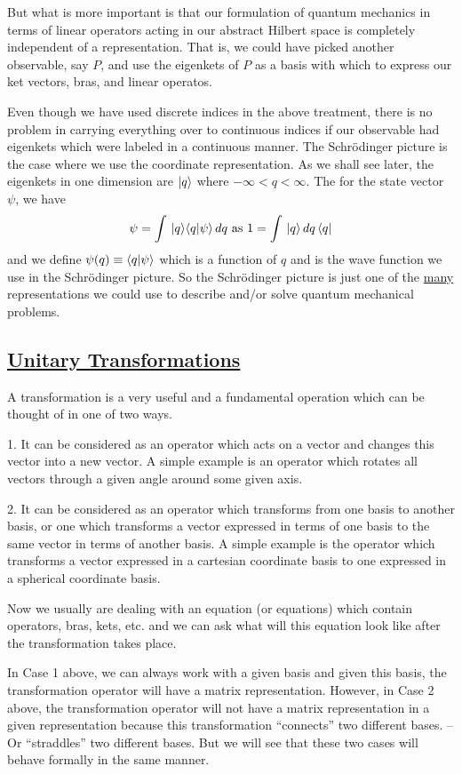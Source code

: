 But what is more important is that our formulation of quantum mechanics in terms of linear operators acting in our abstract  
Hilbert space is completely independent of a representation. That is, we could have picked another observable, say $P$, and use the eigenkets of $P$ as a basis with which to express our ket vectors, bras, and linear operatos. 

Even though we have used discrete indices in the above treatment, there is no problem in carrying everything over to continuous indices if our observable had eigenkets which were labeled in a continuous manner. The Schr\"odinger
picture is the case where we use the coordinate representation. As we shall see later, the eigenkets in one dimension are $|q\rangle$ where $-\infty < q < \infty$. The for the state vector $\psi$, we have
$$\psi = \int\, |q\rangle\langle q|\psi\rangle\, dq \mbox{ as } 1 = \int\, |q\rangle\, dq\, \langle q|$$ and we define $\psi(q) \equiv \langle q|\psi\rangle$ which is a function of $q$  and is the wave function we use in the Schr\"odinger picture. So the 
Schr\"odinger picture is just one of the \underline{many} representations we could use to describe and/or solve quantum mechanical problems. 

\subsection{\underline{Unitary Transformations}}
A transformation is a very useful and a fundamental operation which can be thought of in one of two ways.

1. It can be considered as an operator which acts on a vector and changes this vector into a new vector. A simple example is an operator which rotates all vectors through a given angle around some given axis. 

2. It can be considered as an operator which transforms from one basis to another basis, or one which transforms a vector expressed in terms of one basis to the same vector in terms of another basis. A simple example is the operator
which transforms a vector expressed in a cartesian coordinate basis to one expressed in a spherical coordinate basis.

Now we usually are dealing with an equation (or equations) which contain operators, bras, kets, etc. and we can ask what will this equation look like after the transformation takes place.

In Case 1 above, we can always work with a given basis and given this
basis, the transformation operator will have a matrix representation. However, in Case 2 above, the transformation operator will not have a matrix representation in a given representation because this transformation ``connects'' two 
different bases. -- Or ``straddles'' two different bases. But we will see that these two cases will behave formally in the same manner. 

